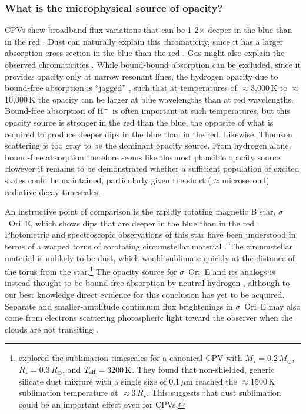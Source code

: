\documentclass[11pt,twocolumn,tighten,linenumbers]{aastex63}
\begin{document}
\subsubsection{What is the microphysical source of opacity?}

CPVs show broadband flux variations that can be 1-2$\times$ deeper in
the blue than in the red
\citep{2017PASJ...69L...2O,2020AJ....160...86B,2022AJ....163..144G,2023MNRAS.518.2921K}.
Dust can naturally explain this chromaticity, since it has a larger
absorption cross-section in the blue than the red
\citep[e.g.][]{1989ApJ...345..245C}.  Gas might also explain the
observed chromaticities \citep{1992oasp.book.....G}.  While
bound-bound absorption can be excluded, since it provides opacity only
at narrow resonant lines, the hydrogen opacity due to bound-free
absorption is ``jagged'' \citep[see][Figure 8.5 and
Eq.~8.8]{1992oasp.book.....G}, such that at temperatures of
$\approx$3{,}000\,K to $\approx$10{,}000\,K the opacity can be larger
at blue wavelengths than at red wavelengths.  Bound-free absorption of
${\rm H}^{-}$ is often important at such temperatures, but this
opacity source is stronger in the red than the blue, the opposite of
what is required to produce deeper dips in the blue than in the red.
Likewise, Thomson scattering is too gray to be the dominant opacity
source.  From hydrogen alone, bound-free absorption therefore seems
like the most plausible opacity source.  However it remains to be
demonstrated whether a sufficient population of excited states could
be maintained, particularly given the short ($\approx$microsecond)
radiative decay timescales.

An instructive point of comparison is the rapidly rotating magnetic B
star, $\sigma$~Ori~E, which shows dips that are deeper in the blue
than in the red \citep{1977ApJ...216L..31H}.  Photometric and
spectroscopic observations of this star have been understood in terms
of a warped torus of corotating circumstellar material
\citep{1978ApJ...224L...5L,1985Ap&SS.116..285N,2005ApJ...630L..81T}.
The circumstellar material is unlikely to be dust, which would
sublimate quickly at the distance of the torus from the
star.\footnote{\citet{2019ApJ...876..127Z} explored the sublimation
timescales for a canonical CPV with $M_\star=0.2\,M_\odot$,
$R_\star=0.3\,R_\odot$, and $T_{\rm eff}=3200\,{\rm K}$.  They found
that non-shielded, generic silicate dust mixture
\citep{1985ApJS...57..587D} with a single size of 0.1\,$\mu$m reached
the $\approx$1500\,K sublimation temperature at $\approx$3\,$R_\star$.
This suggests that dust sublimation could be an important effect even
for CPVs. }  The opacity source for $\sigma$~Ori~E and its analogs is
instead thought to be bound-free absorption by neutral hydrogen
\citep{1985Ap&SS.116..285N}, although to our best knowledge direct
evidence for this conclusion has yet to be acquired.  Separate and
smaller-amplitude continuum flux brightenings in $\sigma$~Ori~E may
also come from electrons scattering photospheric light toward the
observer when the clouds are not transiting
\citep{2022MNRAS.511.4815B}.
\end{document}
